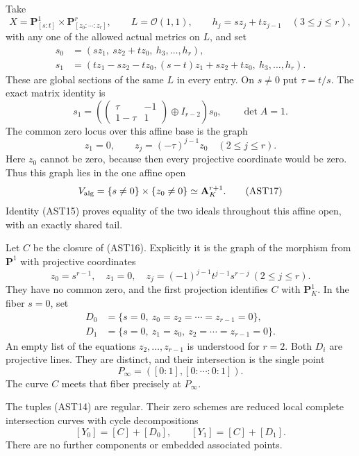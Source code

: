 Take
\[
 X=\mathbf P^1_{[s:t]}\times\mathbf P^r_{[z_0:\cdots:z_r]},
       \qquad L=\mathcal O(1,1),
       \qquad h_j=s z_j+t z_{j-1}\quad(3\le j\le r),
 \tag{AST13}
\]
with any one of the allowed actual metrics on $L$, and set
\[
 \begin{split}
 s_0&=(s z_1,\ s z_2+t z_0,\ h_3,\ldots,h_r),\\
 s_1&=(t z_1-s z_2-t z_0,
          (s-t)z_1+s z_2+t z_0,\ h_3,\ldots,h_r).
 \end{split}
 \tag{AST14}
\]
These are global sections of the same $L$ in every entry.
On $s\ne0$ put $\tau=t/s$.  The exact matrix identity is
\[
 s_1=\left(\begin{pmatrix}\tau&-1\\1-\tau&1\end{pmatrix}
                           \oplus I_{r-2}\right)s_0,
                    \qquad\det A=1.
 \tag{AST15}
\]
The common zero locus over this affine base is the graph
\[
          z_1=0,\qquad z_j=(-\tau)^{j-1}z_0
                     \quad(2\le j\le r).
 \tag{AST16}
\]
Here $z_0$ cannot be zero, because then every projective
coordinate would be zero.  Thus this graph lies in the one
affine open
\[
       V_{\rm alg}=\{s\ne0\}\times\{z_0\ne0\}
                                  \simeq\mathbf A^{r+1}_K.
 \tag{AST17}
\]
Identity (AST15) proves equality of the two ideals throughout
this affine open, with an exactly shared tail.

Let $C$ be the closure of (AST16).  Explicitly it is the graph
of the morphism from $\mathbf P^1$ with projective coordinates
\[
 z_0=s^{r-1},\quad z_1=0,\quad
 z_j=(-1)^{j-1}t^{j-1}s^{r-j}\ (2\le j\le r).
 \tag{AST18}
\]
They have no common zero, and the first projection identifies
$C$ with $\mathbf P^1_K$.  In the fiber $s=0$, set
\[
 \begin{split}
 D_0&=\{s=0,\ z_0=z_2=\cdots=z_{r-1}=0\},\\
 D_1&=\{s=0,\ z_1=z_0,\ z_2=\cdots=z_{r-1}=0\}.
 \end{split}
 \tag{AST19}
\]
An empty list of the equations $z_2,\ldots,z_{r-1}$ is
understood for $r=2$.  Both $D_i$ are projective lines.
They are distinct, and their intersection is the single point
\[
             P_\infty=([0:1],[0:\cdots:0:1]).
 \tag{AST20}
\]
The curve $C$ meets that fiber precisely at $P_\infty$.

\begin{lemma}
The tuples (AST14) are regular.  Their zero schemes are reduced
local complete intersection curves with cycle decompositions
\[
                     [Y_0]=[C]+[D_0],\qquad
                     [Y_1]=[C]+[D_1].
 \tag{AST21}
\]
There are no further components or embedded associated points.
\end{lemma}

